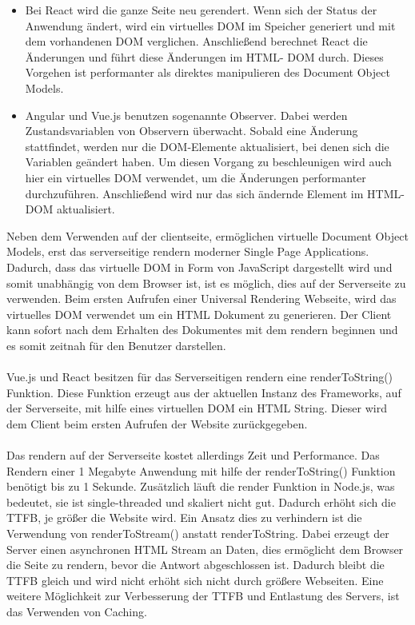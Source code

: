 \documentclass[runningheads]{llncs}
\begin{document}
\begin{itemize}
  \setlength\itemsep{1em}
  \item Bei React wird die ganze Seite neu gerendert. 
  Wenn sich der Status der Anwendung ändert, 
  wird ein virtuelles DOM im Speicher generiert 
  und mit dem vorhandenen DOM verglichen. 
  Anschließend berechnet React die Änderungen und führt diese 
  Änderungen im HTML- DOM durch. 
  Dieses Vorgehen ist performanter als direktes manipulieren 
  des Document Object Models.

  \item Angular und Vue.js benutzen sogenannte Observer. 
  Dabei werden  Zustandsvariablen von Observern überwacht. 
  Sobald eine Änderung stattfindet, 
  werden nur die DOM-Elemente aktualisiert, 
  bei denen sich die Variablen geändert haben. 
  Um diesen Vorgang zu beschleunigen 
  wird auch hier ein virtuelles DOM verwendet, 
  um die Änderungen performanter durchzuführen. 
  Anschließend wird nur das sich ändernde Element im HTML- DOM aktualisiert.
\end{itemize}
Neben dem Verwenden auf der clientseite, 
ermöglichen virtuelle Document Object Models, 
erst das serverseitige rendern moderner Single Page Applications. 
Dadurch, dass das virtuelle DOM in Form von JavaScript dargestellt wird und 
somit unabhängig von dem Browser ist, 
ist es möglich, dies auf der Serverseite zu verwenden. 
Beim ersten Aufrufen einer Universal Rendering Webseite, 
wird das virtuelles DOM verwendet um ein HTML Dokument zu generieren. 
Der Client kann sofort nach dem Erhalten des Dokumentes mit dem rendern beginnen und 
es somit zeitnah für den Benutzer darstellen.
\\
\\
Vue.js und React besitzen für das Serverseitigen rendern eine renderToString() Funktion. 
Diese Funktion erzeugt aus der aktuellen Instanz des Frameworks, 
auf der Serverseite, 
mit hilfe eines virtuellen DOM ein HTML String. 
Dieser wird dem Client beim ersten Aufrufen der Website zurückgegeben.
\\
\\
Das rendern auf der Serverseite kostet allerdings Zeit und Performance. 
Das Rendern einer 1 Megabyte Anwendung mit hilfe der renderToString() 
Funktion benötigt bis zu 1 Sekunde. 
Zusätzlich läuft die render Funktion in Node.js, 
was bedeutet, sie ist single-threaded und skaliert nicht gut. 
Dadurch erhöht sich die TTFB, je größer die Website wird. 
Ein Ansatz dies zu verhindern ist die Verwendung von renderToStream() anstatt renderToString. 
Dabei erzeugt der Server einen asynchronen HTML Stream an Daten, 
dies ermöglicht dem Browser die Seite zu rendern, 
bevor die Antwort abgeschlossen ist. 
Dadurch bleibt die TTFB gleich und 
wird nicht erhöht sich nicht durch größere Webseiten. 
Eine weitere Möglichkeit zur Verbesserung der TTFB und Entlastung des Servers, 
ist das Verwenden von Caching.
\end{document}
